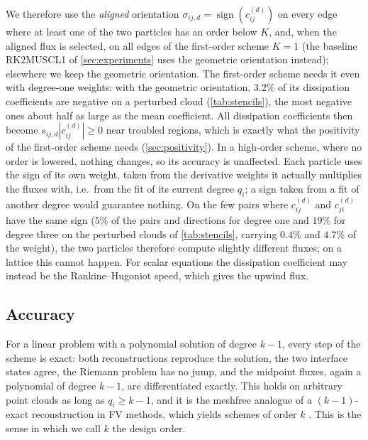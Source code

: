 \documentclass[11pt,a4paper]{article}
\numberwithin{equation}{section}
\newcommand{\sgn}{\operatorname{sign}}
\begin{document}
We therefore use the \emph{aligned} orientation $\sigma_{ij,d}=\sgn(c^{(d)}_{ij})$ on every edge where at least one of the two particles has an order below $K$, and, when the aligned flux is selected, on all edges of the first-order scheme $K=1$ (the baseline RK2MUSCL1 of \cref{sec:experiments} uses the geometric orientation instead); elsewhere we keep the geometric orientation. The first-order scheme needs it even with degree-one weights: with the geometric orientation, $3.2\%$ of its dissipation coefficients are negative on a perturbed cloud (\cref{tab:stencils}), the most negative ones about half as large as the mean coefficient. All dissipation coefficients then become $s_{ij,d}|c^{(d)}_{ij}|\ge0$ near troubled regions, which is exactly what the positivity of the first-order scheme needs (\cref{sec:positivity}). In a high-order scheme, where no order is lowered, nothing changes, so its accuracy is unaffected. Each particle uses the sign of its own weight, taken from the derivative weights it actually multiplies the fluxes with, i.e.\ from the fit of its current degree $q_i$; a sign taken from a fit of another degree would guarantee nothing. On the few pairs where $c^{(d)}_{ij}$ and $c^{(d)}_{ji}$ have the same sign ($5\%$ of the pairs and directions for degree one and $19\%$ for degree three on the perturbed clouds of \cref{tab:stencils}, carrying $0.4\%$ and $4.7\%$ of the weight), the two particles therefore compute slightly different fluxes; on a lattice this cannot happen. For scalar equations the dissipation coefficient may instead be the Rankine--Hugoniot speed, which gives the upwind flux.

\subsection{Accuracy}\label{sec:consistency}

For a linear problem with a polynomial solution of degree $k-1$, every step of the scheme is exact: both reconstructions reproduce the solution, the two interface states agree, the Riemann problem has no jump, and the midpoint fluxes, again a polynomial of degree $k-1$, are differentiated exactly. This holds on arbitrary point clouds as long as $q_i\ge k-1$, and it is the meshfree analogue of a $(k-1)$-exact reconstruction in FV methods, which yields schemes of order $k$ \cite{BarthFrederickson1990}. This is the sense in which we call $k$ the design order.
\end{document}
